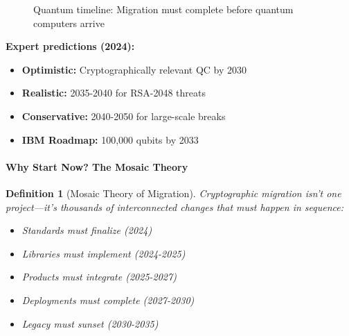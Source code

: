 \documentclass[11pt,a4paper]{article}
\newtheorem{definition}{Definition}
\begin{document}
\begin{figure}[h]
\centering
{}
\caption{Quantum timeline: Migration must complete before quantum computers arrive}
\end{figure}

\textbf{Expert predictions (2024):}
\begin{itemize}
    \item \textbf{Optimistic:} Cryptographically relevant QC by 2030
    \item \textbf{Realistic:} 2035-2040 for RSA-2048 threats
    \item \textbf{Conservative:} 2040-2050 for large-scale breaks
    \item \textbf{IBM Roadmap:} 100,000 qubits by 2033
\end{itemize}

\paragraph{Why Start Now? The Mosaic Theory}

\begin{definition}[Mosaic Theory of Migration]
Cryptographic migration isn't one project—it's thousands of interconnected changes that must happen in sequence:
\begin{itemize}
    \item Standards must finalize (2024) \checkmark
    \item Libraries must implement (2024-2025)
    \item Products must integrate (2025-2027)
    \item Deployments must complete (2027-2030)
    \item Legacy must sunset (2030-2035)
\end{itemize}
\end{definition}
\end{document}
